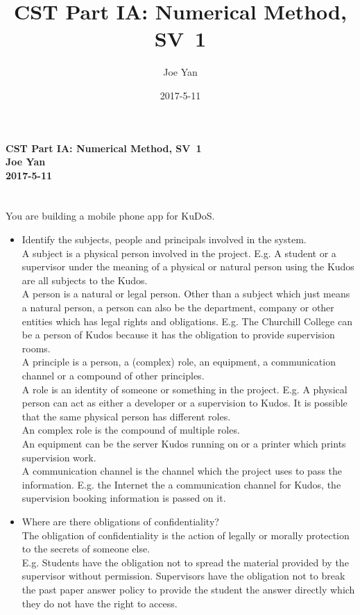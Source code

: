 \documentclass[10pt,twoside,a4paper]{article}
\newcommand{\studentname}{Joe Yan}
\newcommand{\svworkdate}{2017-5-11}
\newcommand{\svcourse}{CST Part IA: Numerical Method}
\newcommand{\svnumber}{1}
\begin{document}
\author{\studentname}
\title{\svcourse, SV~\svnumber}
\date{\svworkdate}

\textbf{\svcourse, SV~\svnumber}\\
\textbf{\studentname}\\
\textbf{\svworkdate}\\

\section*{}
You are building a mobile phone app for KuDoS. 
\begin{itemize}
\item
Identify the subjects, people and principals involved in the system. 
\\A subject is a physical person involved in the project. E.g. A student or a supervisor under the meaning of a physical or natural person using the Kudos are all subjects to the Kudos.
\\A person is a natural or legal person. Other than a subject which just means a natural person, a person can also be the department, company or other entities which has legal rights and obligations. E.g. The Churchill College can be a person of Kudos because it has the obligation to provide supervision rooms.
\\A principle is a person, a (complex) role, an equipment, a communication channel or a compound of other principles. 
\\A role is an identity of someone or something in the project. E.g. A physical person can act as either a developer or a supervision to Kudos. It is possible that the same physical person has different roles. 
\\An complex role is the compound of multiple roles.
\\An equipment can be the server Kudos running on or a printer which prints supervision work.
\\A communication channel is the channel which the project uses to pass the information. E.g. the Internet the a communication channel for Kudos, the supervision booking information is passed on it.
\item
Where are there obligations of confidentiality? 
\\The obligation of confidentiality is the action of legally or morally protection to the secrets of someone else.
\\E.g. Students have the obligation not to spread the material provided by the supervisor without permission. Supervisors have the obligation not to break the past paper answer policy to provide the student the answer directly which they do not have the right to access.

\end{itemize}
\end{document}
